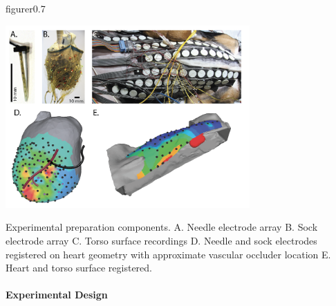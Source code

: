 \begin{wrapfloat}{figure}{r}{0.7\textwidth}
	\begin{center}
		{\includegraphics[width=0.7\textwidth]
			{../Figures/fig1.png}}
		\captionsetup{width = 0.7\textwidth}
		\caption{\small \label{fig:prep} Experimental preparation
			components. A. Needle electrode array B. Sock electrode array
			C. Torso surface recordings D. Needle and sock electrodes
			registered on heart geometry with approximate vascular occluder
			location E. Heart and torso surface registered.}
	\end{center}
\end{wrapfloat}

\paragraph{Experimental Design}

